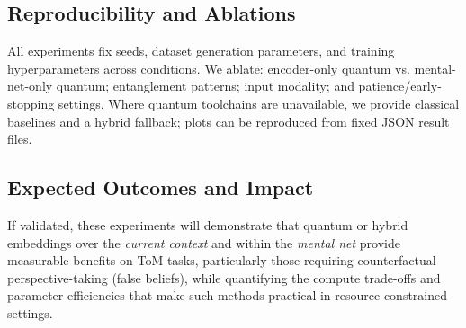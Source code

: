 \subsection{Reproducibility and Ablations}
All experiments fix seeds, dataset generation parameters, and training hyperparameters across conditions. We ablate: encoder-only quantum vs. mental-net-only quantum; entanglement patterns; input modality; and patience/early-stopping settings. Where quantum toolchains are unavailable, we provide classical baselines and a hybrid fallback; plots can be reproduced from fixed JSON result files.

\subsection{Expected Outcomes and Impact}
If validated, these experiments will demonstrate that quantum or hybrid embeddings over the \emph{current context} and within the \emph{mental net} provide measurable benefits on ToM tasks, particularly those requiring counterfactual perspective-taking (false beliefs), while quantifying the compute trade-offs and parameter efficiencies that make such methods practical in resource-constrained settings.
